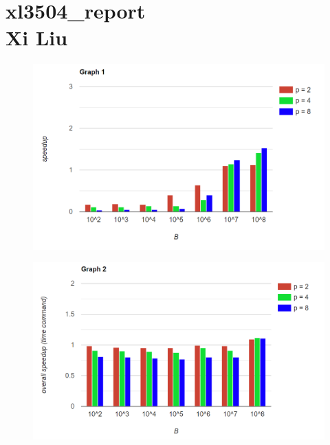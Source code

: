 \documentclass[12pt,border=4pt,multi]{article} %
\begin{document}
\section*{xl3504\_report\\Xi Liu}
\begin{figure}[h!]
	\centering
	\includegraphics[width=1.1\textwidth, height=0.9\textwidth]{graph1} %
\end{figure}
\newpage
\noindent
\begin{figure}[h!]
	\centering
	\includegraphics[width=1.1\textwidth, height=0.9\textwidth]{graph2} %
\end{figure}\\
\end{document}

